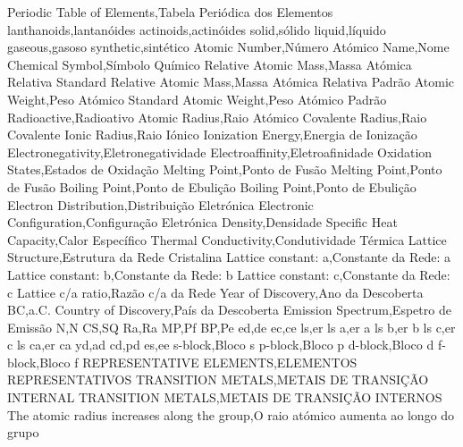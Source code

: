 %
Periodic Table of Elements,Tabela Periódica dos Elementos
lanthanoids,lantanóides
actinoids,actinóides
solid,sólido
liquid,líquido
gaseous,gasoso
synthetic,sintético
Atomic Number,Número Atómico
Name,Nome
Chemical Symbol,Símbolo Químico
Relative Atomic Mass,Massa \mbox{Atómica} Relativa
Standard Relative Atomic Mass,Massa Atómica Relativa Padrão
Atomic Weight,Peso Atómico
Standard Atomic Weight,Peso Atómico Padrão
Radioactive,Radioativo
Atomic Radius,Raio Atómico
Covalente Radius,Raio \mbox{Covalente}
Ionic Radius,Raio Iónico
Ionization Energy,Energia de Ionização
Electronegativity,Eletrone\-gatividade
Electroaffinity,Eletro\-afinidade
Oxidation States,Estados de Oxidação
Melting Point,Ponto de Fusão
Melting Point,Ponto de Fusão
Boiling Point,Ponto de Ebulição
Boiling Point,Ponto de Ebulição
Electron Distribution,Distribuição Eletrónica
Electronic Configuration,Configuração Eletrónica
Density,Densidade
Specific Heat Capacity,Calor \mbox{Específico}
Thermal Conductivity,Condutividade Térmica
Lattice Structure,Estrutura da Rede Cristalina
Lattice constant: a,Constante da Rede: a
Lattice constant: b,Constante da Rede: b
Lattice constant: c,Constante da Rede: c
Lattice c/a ratio,Razão c\mbox{/}a da Rede
Year of Discovery,Ano da \mbox{Descoberta}
BC,a.C.
Country of Discovery,País da \mbox{Descoberta}
Emission Spectrum,Espetro de Emissão
N,N
CS,SQ
Ra,Ra
MP,Pf
BP,Pe
ed,de
ec,ce
ls,er
ls a,er a
ls b,er b
ls c,er c
ls ca,er ca
yd,ad
cd,pd
es,ee
s-block,Bloco s
p-block,Bloco p
d-block,Bloco d
f-block,Bloco f
REPRESENTATIVE ELEMENTS,ELEMENTOS REPRESENTATIVOS
TRANSITION METALS,METAIS DE TRANSIÇÃO
INTERNAL TRANSITION METALS,METAIS DE TRANSIÇÃO INTERNOS
The atomic radius increases along the group,O raio atómico aumenta ao longo do grupo
